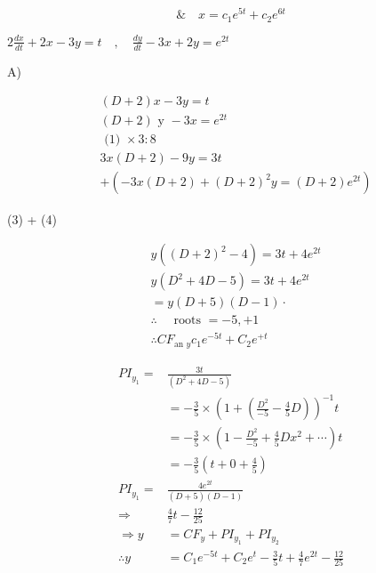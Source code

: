 \documentclass[12pt, a4paper]{article}
\begin{document}
$$
\& \quad x=c_{1} e^{5 t}+c_{2} e^{6 t}
$$

	$2 \frac{d x}{d t}+2 x-3 y=t \quad, \quad \frac{d y}{d t}-3 x+2 y=e^{2 t}$

	A)


	\begin{align*}
		 & (D+2) x-3 y=t                                             \\
		 & (D+2) \text{ y }-3 x=e^{2 t}  \tag{2}                     \\
		 & \text{ (1) } \times 3: 8                                  \\
		 & 3 x(D+2)-9 y=3 t  \tag{3}                                 \\
		 & +\left(-3 x(D+2)+(D+2)^{2} y=(D+2) e^{2 t}\right) \tag{9}
	\end{align*}


	(3) + (4)

$$
\begin{aligned}
	 & y\left((D+2)^{2}-4\right)=3 t+4 e^{2 t}                   \\
	 & y\left(D^{2}+4 D-5\right)=3 t+4 e^{2 t}                   \\
	 & =y(D+5)(D-1) \cdot                                        \\
	 & \therefore \quad \text{ roots }=-5,+1                     \\
	 & \therefore C F_{\text{an } y} c_{1} e^{-5 t}+C_{2} e^{+t}
\end{aligned}
$$

$$
\begin{aligned}
	P I_{y_{1}}=  & \frac{3 t}{\left(D^{2}+4 D-5\right)}                                                  \\
	              & =-\frac{3}{5} \times\left(1+\left(\frac{D^{2}}{-5}-\frac{4}{5} D\right)\right)^{-1} t \\
	              & =-\frac{3}{5} \times\left(1-\frac{D^{2}}{-5}+\frac{4}{5} D x^2 +\cdots\right) t       \\
	              & =-\frac{3}{5}\left(t+0+\frac{4}{5}\right)                                             \\
	P I_{y_{1}}=  & \frac{4 e^{2 t}}{(D+5)(D-1)}                                                          \\
	\Rightarrow   & \frac{4}{7} t-\frac{12}{25}                                                           \\
	\Rightarrow y & =C F_{y}+P I_{y_{1}}+P I_{y_{2}}                                                      \\
	\therefore y  & =C_{1} e^{-5 t}+C_{2} e^{t}-\frac{3}{5} t+\frac{4}{7} e^{2 t}-\frac{12}{25}
\end{aligned}
$$
\end{document}
